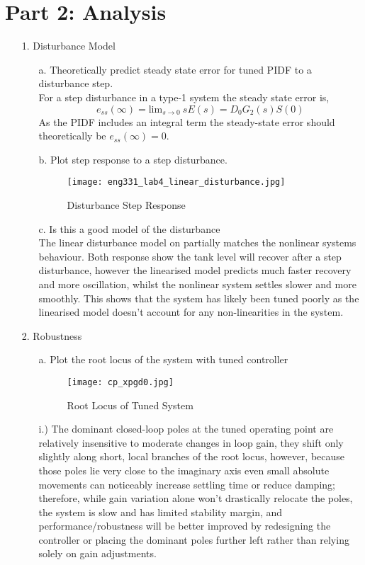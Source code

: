 \documentclass[12pt,a4paper]{article}
\begin{document}
\section*{Part 2: Analysis}
 
\begin{enumerate}
	\item [1.] Disturbance Model
		\begin{enumerate}
			\item [a.] Theoretically predict steady state error for tuned PIDF to a disturbance step.\\
				For a step disturbance in a type-1 system the steady state error is,
				$$e_{ss}(\infty)=\text{lim}_{s\rightarrow 0}\:sE(s)=D_0G_2(s)S(0)$$
			As the PIDF includes an integral term the steady-state error should theoretically be $e_{ss}(\infty)=0$.
				\hfill
			\item [b.] Plot step response to a step disturbance.
				\begin{figure}[H]
					\centering
					\texttt{[image: eng331\_lab4\_linear\_disturbance.jpg]}
					\caption{Disturbance Step Response}
				\end{figure}
				\hfill
			\item [c.] Is this a good model of the disturbance\\
				The linear disturbance model on partially matches the nonlinear systems behaviour. Both response show the tank level will recover after a step disturbance, however the linearised model predicts much faster recovery and more oscillation, whilst the nonlinear system settles slower and more smoothly. This shows that the system has likely been tuned poorly as the linearised model doesn't account for any non-linearities in the system.
				\hfill
		\end{enumerate}
	\item [2.] Robustness
		\begin{enumerate}
			\item [a.] Plot the root locus of the system with tuned controller
				\begin{figure}[H]
					\centering
					\texttt{[image: cp\_xpgd0.jpg]}
					\caption{Root Locus of Tuned System}
				\end{figure}
				i.)
The dominant closed-loop poles at the tuned operating point are relatively insensitive to moderate changes in loop gain, they shift only slightly along short, local branches of the root locus,  however, because those poles lie very close to the imaginary axis even small absolute movements can noticeably increase settling time or reduce damping; therefore, while gain variation alone won't drastically relocate the poles, the system is slow and has limited stability margin, and performance/robustness will be better improved by redesigning the controller or placing the dominant poles further left rather than relying solely on gain adjustments.

\end{enumerate}
\end{enumerate}
\end{document}
